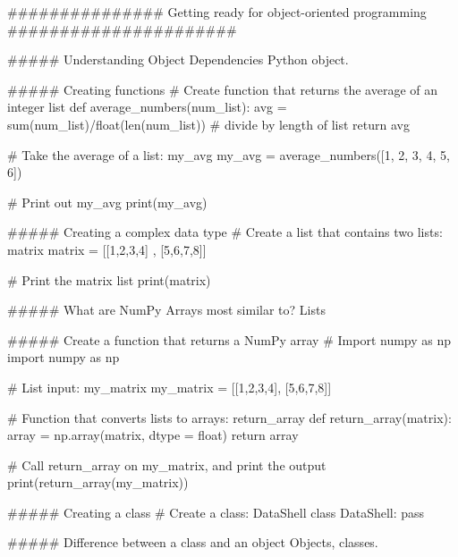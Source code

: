 ###############  Getting ready for object-oriented programming   ######################

##### Understanding Object Dependencies
Python object.

##### Creating functions
# Create function that returns the average of an integer list
def average_numbers(num_list): 
    avg = sum(num_list)/float(len(num_list)) # divide by length of list
    return avg

# Take the average of a list: my_avg
my_avg = average_numbers([1, 2, 3, 4, 5, 6])

# Print out my_avg
print(my_avg)


##### Creating a complex data type
# Create a list that contains two lists: matrix
matrix = [[1,2,3,4] , [5,6,7,8]]

# Print the matrix list
print(matrix)


##### What are NumPy Arrays most similar to?
Lists


##### Create a function that returns a NumPy array
# Import numpy as np
import numpy  as np

# List input: my_matrix
my_matrix = [[1,2,3,4], [5,6,7,8]] 

# Function that converts lists to arrays: return_array
def return_array(matrix):
    array = np.array(matrix, dtype = float)
    return array
    
# Call return_array on my_matrix, and print the output
print(return_array(my_matrix))


##### Creating a class
# Create a class: DataShell
class DataShell: 
    pass


##### Difference between a class and an object
Objects, classes.
